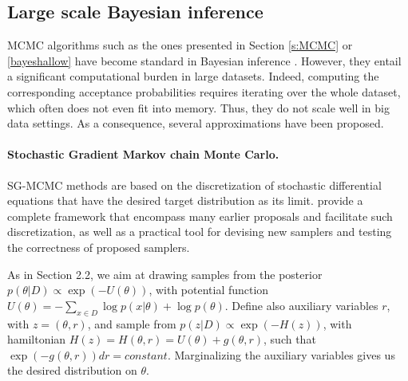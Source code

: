 \subsection{Large scale Bayesian inference}


MCMC algorithms such as the ones presented in Section \ref{s:MCMC} or \ref{bayeshallow} 
have become standard in Bayesian inference \parencite{french}.
However, they entail a significant computational burden in large datasets. Indeed, 
computing the corresponding acceptance probabilities 
 requires iterating over the whole dataset, which often does not even
 fit into memory. Thus, they 
  do not scale well in big data settings. 
 As a consequence, several approximations have been proposed.

\paragraph{Stochastic Gradient Markov chain Monte Carlo.}\label{bayesdeep} 

SG-MCMC methods are based on the discretization of 
stochastic differential equations that have the desired target 
distribution as its limit. \parencite{ma2015complete} provide a
complete framework that encompass many earlier proposals and
facilitate such discretization, as well as a practical tool for
devising new samplers and testing the correctness of proposed samplers.

As in Section 2.2, we aim at drawing samples from the
posterior $p(\theta |D) \propto \exp(-U(\theta ))$,
with potential function
$U(\theta ) = -\sum _{x\in D} \log p(x|\theta ) + \log p(\theta )$. Define also auxiliary variables $r$,
with $z=( \theta, r )$, and sample from $p(z|D) \propto  \exp(-H(z))$, with hamiltonian
$H(z) = H(\theta , r) = U(\theta ) + g(\theta , r)$, such that
$\exp(-g(\theta , r))dr = constant$. 
Marginalizing the auxiliary variables gives us the desired distribution on $\theta $.

